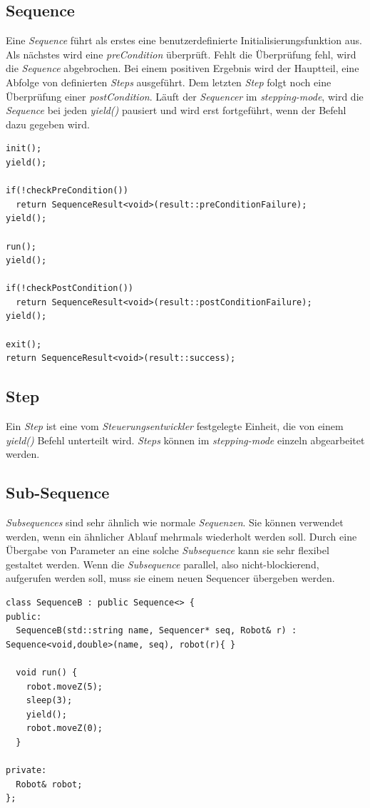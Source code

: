 \subsection{Sequence}
Eine \textit{Sequence} führt als erstes eine benutzerdefinierte Initialisierungsfunktion aus.
Als nächstes wird eine \textit{preCondition} überprüft.
Fehlt die Überprüfung fehl, wird die \textit{Sequence} abgebrochen.
Bei einem positiven Ergebnis wird der Hauptteil, eine Abfolge von definierten \textit{Steps} ausgeführt.
Dem letzten \textit{Step} folgt noch eine Überprüfung einer \textit{postCondition}.
Läuft der \textit{Sequencer} im \textit{stepping-mode}, wird die \textit{Sequence} bei jeden \textit{yield()} pausiert und wird erst fortgeführt, wenn der Befehl dazu gegeben wird. \cite{eerosWiki}

\begin{lstlisting}
init();
yield();

if(!checkPreCondition()) 
  return SequenceResult<void>(result::preConditionFailure);
yield();

run();
yield();

if(!checkPostCondition())
  return SequenceResult<void>(result::postConditionFailure);
yield();

exit();
return SequenceResult<void>(result::success);
\end{lstlisting}


\subsection{Step}
Ein \textit{Step} ist eine vom \textit{Steuerungsentwickler} festgelegte Einheit, die von einem \textit{yield()} Befehl unterteilt wird.
\textit{Steps} können im \textit{stepping-mode} einzeln abgearbeitet werden.


\subsection{Sub-Sequence}
\textit{Subsequences} sind sehr ähnlich wie normale \textit{Sequenzen}.
Sie können verwendet werden, wenn ein ähnlicher Ablauf mehrmals wiederholt werden soll.
Durch eine Übergabe von Parameter an eine solche \textit{Subsequence} kann sie sehr flexibel gestaltet werden.
Wenn die \textit{Subsequence} parallel, also nicht-blockierend, aufgerufen werden soll, muss sie einem neuen Sequencer übergeben werden.

\begin{lstlisting}
class SequenceB : public Sequence<> {
public:
  SequenceB(std::string name, Sequencer* seq, Robot& r) : Sequence<void,double>(name, seq), robot(r){ }
 
  void run() {
    robot.moveZ(5);
    sleep(3);
    yield();
    robot.moveZ(0);
  }
 
private: 
  Robot& robot;
};
\end{lstlisting}



